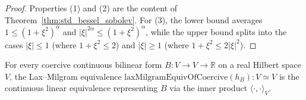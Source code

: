 \begin{proof}
\leanok
Properties (1) and (2) are the content of Theorem~\ref{thm:std_bessel_sobolev}. For (3), the lower bound averages $1 \le (1 + \xi^2)^\alpha$ and $\lvert \xi \rvert^{2\alpha} \le (1 + \xi^2)^\alpha$, while the upper bound splits into the cases $\lvert \xi \rvert \le 1$ (where $1 + \xi^2 \le 2$) and $\lvert \xi \rvert \ge 1$ (where $1 + \xi^2 \le 2\lvert \xi \rvert^2$).
\end{proof}

\begin{definition}\label{def:lax_milgram_equiv}
\leanok
For every coercive continuous bilinear form $B : V \to V \to \mathbb{R}$ on a real Hilbert space $V$, the Lax--Milgram equivalence $\mathrm{laxMilgramEquivOfCoercive}(h_B) : V \simeq V$ is the continuous linear equivalence representing $B$ via the inner product $\langle \cdot, \cdot \rangle_V$.
\end{definition}
